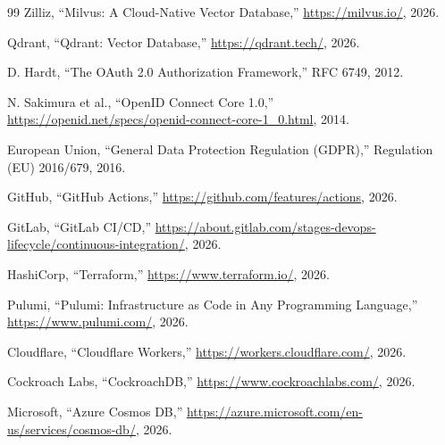 \begin{thebibliography}{99}
Zilliz, ``Milvus: A Cloud-Native Vector Database,'' \url{https://milvus.io/}, 2026.

Qdrant, ``Qdrant: Vector Database,'' \url{https://qdrant.tech/}, 2026.

D. Hardt, ``The OAuth 2.0 Authorization Framework,'' RFC 6749, 2012.

N. Sakimura et al., ``OpenID Connect Core 1.0,'' \url{https://openid.net/specs/openid-connect-core-1_0.html}, 2014.

European Union, ``General Data Protection Regulation (GDPR),'' Regulation (EU) 2016/679, 2016.

GitHub, ``GitHub Actions,'' \url{https://github.com/features/actions}, 2026.

GitLab, ``GitLab CI/CD,'' \url{https://about.gitlab.com/stages-devops-lifecycle/continuous-integration/}, 2026.

HashiCorp, ``Terraform,'' \url{https://www.terraform.io/}, 2026.

Pulumi, ``Pulumi: Infrastructure as Code in Any Programming Language,'' \url{https://www.pulumi.com/}, 2026.

Cloudflare, ``Cloudflare Workers,'' \url{https://workers.cloudflare.com/}, 2026.

Cockroach Labs, ``CockroachDB,'' \url{https://www.cockroachlabs.com/}, 2026.

Microsoft, ``Azure Cosmos DB,'' \url{https://azure.microsoft.com/en-us/services/cosmos-db/}, 2026.

\end{thebibliography}
